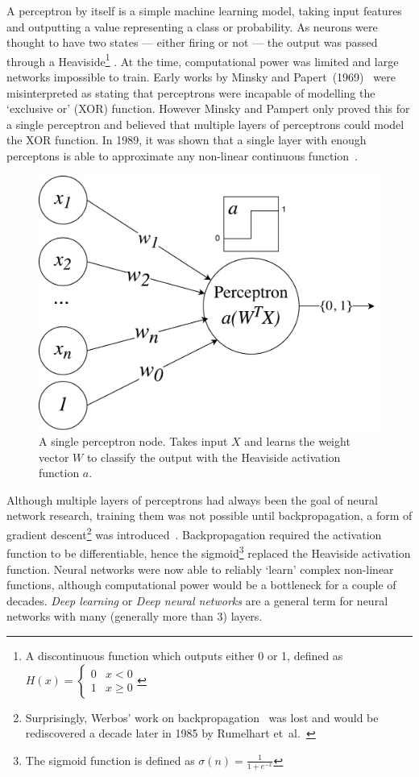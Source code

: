 \documentclass[12pt, twoside]{book}
\renewcommand\emph[1]{\textit{\color{USred}{#1}}}
\begin{document}
A perceptron by itself is a simple machine learning model, taking input features  and outputting a value representing a class or probability. As neurons were thought to have two states --- either firing or not --- the output was passed through a Heaviside\footnote{A discontinuous function which outputs either 0 or 1, defined as $ H(x)=\begin{cases} 
      0 & x < 0 \\
      1 & x \geq 0 
   \end{cases}
$} \emph{activation function}. At the time, computational power was limited and large networks impossible to train. Early works by Minsky and Papert~(1969)~\cite{minsky1969perceptrons} were misinterpreted as stating that perceptrons were incapable of modelling the `exclusive or' (XOR) function. However Minsky and Pampert only proved this for a single perceptron and believed that multiple layers of perceptrons could model the XOR function. In 1989, it was shown that a single layer with enough perceptons is able to approximate any non-linear continuous function~\cite{nnuniversalapprox}.


\begin{figure}[h]
\label{perceptronvis}
\centering\includegraphics[width=0.5\linewidth]{perceptron.pdf}
\caption{A single perceptron node. Takes input $X$ and learns the weight vector $W$ to classify the output with the Heaviside activation function $a$.}
\end{figure}

Although multiple layers of perceptrons had always been the goal of neural network research, training them was not possible until backpropagation, a form of gradient descent\footnote{Surprisingly, Werbos' work on backpropagation~\cite{werbos1974beyond}  was lost and would be rediscovered a decade later in 1985 by Rumelhart et~al.~\cite{backproprediscover}} was introduced~\cite{werbos1974beyond}. Backpropagation required the activation function to be differentiable, hence the sigmoid\footnote{The sigmoid function is defined as $\sigma(n) = \frac{1}{1+e^{-x}}$}  replaced the Heaviside activation function. Neural networks were now able to reliably `learn' complex non-linear functions, although computational power would be a bottleneck for a couple of decades. \textit{Deep learning} or \textit{Deep neural networks} are a general term for neural networks with many (generally more than 3) layers.
\end{document}
